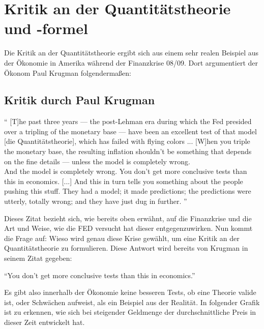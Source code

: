 \section{Kritik an der Quantitätstheorie und -formel}

Die Kritik an der Quantitätstheorie ergibt sich aus einem sehr realen Beispiel aus der Ökonomie in Amerika während der Finanzkrise 08/09. Dort argumentiert der Ökonom Paul Krugman folgendermaßen:

\subsection{Kritik durch Paul Krugman}

\enquote{
[T]he past three years — the post-Lehman era during which the Fed presided over a tripling of the monetary base — have been an excellent test of that model [die Quantitätstheorie], which has failed with flying colors ... [W]hen you triple the monetary base, the resulting inflation shouldn’t be something that depends on the fine details — unless the model is completely wrong.\\
And the model is completely wrong. You don’t get more conclusive tests than this in economics. [...] 
And this in turn tells you something about the people pushing this stuff. They had a model; it made predictions; the predictions were utterly, totally wrong; and they have just dug in further.
}\autocite{Krugman2011} 

Dieses Zitat bezieht sich, wie bereits oben erwähnt, auf die Finanzkrise und die Art und Weise, wie die FED versucht hat dieser entgegenzuwirken. Nun kommt die Frage auf: Wieso wird genau diese Krise gewählt, um eine Kritik an der Quantitätstheorie zu formulieren. Diese Antwort wird bereits von Krugman in seinem Zitat gegeben:
\begin{center}
    \enquote{You don’t get more conclusive tests than this in economics.}
\end{center}

Es gibt also innerhalb der Ökonomie keine besseren Tests, ob eine Theorie valide ist, oder Schwächen aufweist, als ein Beispiel aus der Realität. In folgender Grafik ist zu erkennen, wie sich bei steigender Geldmenge der durchschnittliche Preis in dieser Zeit entwickelt hat.

